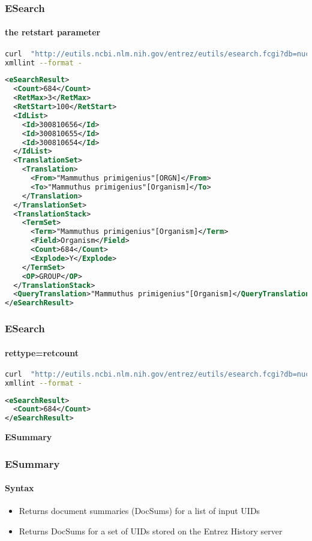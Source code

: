 \documentclass{beamer}
\newcommand{\centeredtitle}[1]{
\begin{center}
    \Huge{\bf{#1}}
\end{center}
}
\newcommand{\hugeslide}[1]{
\begin{frame}
\centeredtitle{#1}
\end{frame}
}
\begin{document}
\begin{frame}[fragile]
\frametitle{ESearch}
\framesubtitle{the retstart parameter }
\begin{lstlisting}[language=bash,basicstyle=\tiny,breaklines=true]
curl  "http://eutils.ncbi.nlm.nih.gov/entrez/eutils/esearch.fcgi?db=nucleotide&term=%22Mammuthus%20primigenius%22%5BORGN%5D&retmax=2&retstart=100" |\
xmllint --format -
\end{lstlisting}

\begin{lstlisting}[language=xml,basicstyle=\tiny,breaklines=false]
<eSearchResult>
  <Count>684</Count>
  <RetMax>3</RetMax>
  <RetStart>100</RetStart>
  <IdList>
    <Id>300810656</Id>
    <Id>300810655</Id>
    <Id>300810654</Id>
  </IdList>
  <TranslationSet>
    <Translation>
      <From>"Mammuthus primigenius"[ORGN]</From>
      <To>"Mammuthus primigenius"[Organism]</To>
    </Translation>
  </TranslationSet>
  <TranslationStack>
    <TermSet>
      <Term>"Mammuthus primigenius"[Organism]</Term>
      <Field>Organism</Field>
      <Count>684</Count>
      <Explode>Y</Explode>
    </TermSet>
    <OP>GROUP</OP>
  </TranslationStack>
  <QueryTranslation>"Mammuthus primigenius"[Organism]</QueryTranslation>
</eSearchResult>
\end{lstlisting}
\end{frame}

\begin{frame}[fragile]
\frametitle{ESearch}
\framesubtitle{rettype=retcount  }
\begin{lstlisting}[language=bash,basicstyle=\tiny,breaklines=true]
curl  "http://eutils.ncbi.nlm.nih.gov/entrez/eutils/esearch.fcgi?db=nucleotide&term=%22Mammuthus%20primigenius%22%5BORGN%5D&rettype=count" |\
xmllint --format -
\end{lstlisting}

\begin{lstlisting}[language=xml,breaklines=false]
<eSearchResult>
  <Count>684</Count>
</eSearchResult>
\end{lstlisting}
\end{frame}


\hugeslide{ESummary}

\begin{frame}[fragile]
\frametitle{ESummary}
\framesubtitle{Syntax}
\begin{itemize}
\item Returns document summaries (DocSums) for a list of input UIDs
\item Returns DocSums for a set of UIDs stored on the Entrez History server
\end{itemize}
\end{frame}
\end{document}
